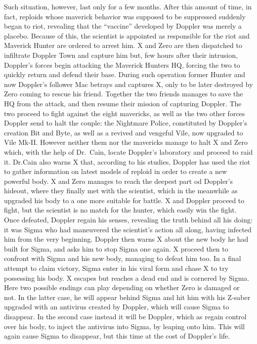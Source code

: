 Such situation, however, last only for a few months. After this amount of time, in fact, reploids whose maverick behavior was supposed to be suppressed suddenly began to riot, revealing that the ``vaccine'' developed by Doppler was merely a placebo. Because of this, the scientist is appointed as responsible for the riot and Maverick Hunter are ordered to arrest him. X and Zero are then dispatched to infiltrate Doppler Town and capture him but, few hours after their intrusion, Doppler's forces begin attacking the Maverick Hunters HQ, forcing the two to quickly return and defend their base. During such operation former Hunter and now Doppler's follower Mac betrays and captures X, only to be later destroyed by Zero coming to rescue his friend. Together the two friends manages to save the HQ from the attack, and then resume their mission of capturing Doppler. The two proceed to fight against the eight mavericks, as well as the two other forces Doppler send to halt the couple: the Nightmare Police, constituted by Doppler's creation Bit and Byte, as well as a revived and vengeful Vile, now upgraded to Vile Mk-II. However neither them nor the mavericks manage to halt X and Zero which, with the help of Dr.~Cain, locate Doppler's laboratory and proceed to raid it. Dr.Cain also warns X that, according to his studies, Doppler has used the riot to gather information on latest models of reploid in order to create a new powerful body. X and Zero manages to reach the deepest part od Doppler's hideout, where they finally met with the scientist, which in the meanwhile as upgraded his body to a one more suitable for battle. X and Doppler proceed to fight, but the scientist is no match for the hunter, which easily win the fight. Once defeated, Doppler regain his senses, revealing the truth behind all his doing: it was Sigma who had maneuvered the scientist's action all along, having infected him from the very beginning. Doppler then warns X about the new body he had built for Sigma, and asks him to stop Sigma one again. X proceed then to confront with Sigma and his new body, managing to defeat him too. In a final attempt to claim victory, Sigma enter in his viral form and chase X to try possessing his body. X escapes but reaches a dead end and is cornered by Sigma. Here two possible endings can play depending on whether Zero is damaged or not. In the latter case, he will appear behind Sigma and hit him with his Z-saber upgraded with an antivirus created by Doppler, which will cause Sigma to disappear. In the second case instead it will be Doppler, which as regain control over his body, to inject the antivirus into Sigma, by leaping onto him. This will again cause Sigma to disappear, but this time at the cost of Doppler's life.


